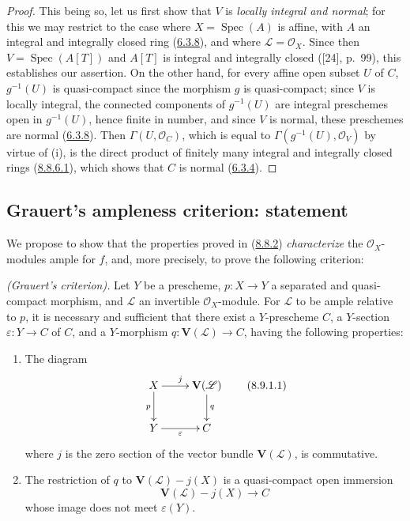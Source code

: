 \begin{proof}
This being so, let us first show that $V$ is \emph{locally integral and
normal}; for this we may restrict to the case where $X=\operatorname{Spec}(A)$
is affine, with $A$ an integral and integrally closed ring
(\hyperref[II.6.3.8]{6.3.8}), and where
$\mathcal{L}=\mathcal{O}_X$. Since then
$V=\operatorname{Spec}(A[T])$ and $A[T]$ is integral and integrally closed
([24], p.~99), this establishes our assertion. On the other hand, for every
affine open subset $U$ of $C$, $g^{-1}(U)$ is quasi-compact since the morphism
$g$ is quasi-compact; since $V$ is locally integral, the connected components
of $g^{-1}(U)$ are integral preschemes open in $g^{-1}(U)$, hence finite in
number, and since $V$ is normal, these preschemes are normal
(\hyperref[II.6.3.8]{6.3.8}). Then $\Gamma(U,\mathcal{O}_C)$, which is equal
to $\Gamma(g^{-1}(U),\mathcal{O}_V)$ by virtue of (i), is the direct product
of finitely many integral and integrally closed rings
(\hyperref[II.8.8.6.1]{8.8.6.1}), which shows that $C$ is normal
(\hyperref[II.6.3.4]{6.3.4}).
\end{proof}

\subsection{Grauert's ampleness criterion: statement}
\label{subsection:II.8.9}

We propose to show that the properties proved in
(\hyperref[II.8.8.2]{8.8.2}) \emph{characterize} the
$\mathcal{O}_X$-modules ample for $f$, and, more precisely, to prove the
following criterion:

\begin{theorem}[8.9.1]
\label{II.8.9.1}
\emph{(Grauert's criterion).} Let $Y$ be a prescheme,
$p:X\to Y$ a separated and quasi-compact morphism, and $\mathcal{L}$ an
invertible $\mathcal{O}_X$-module. For $\mathcal{L}$ to be ample
relative to $p$, it is necessary and sufficient that there exist a
$Y$-prescheme $C$, a $Y$-section $\varepsilon:Y\to C$ of $C$, and a
$Y$-morphism $q:\mathbf{V}(\mathcal{L})\to C$, having the following
properties:
\begin{enumerate}
  \item[\rm{(i)}] The diagram
  \begin{equation}
  \label{II.8.9.1.1}
    \xymatrix{
      X\ar[r]^{j}\ar[d]_{p} & \mathbf{V}(\mathcal{L})\ar[d]^{q}\\
      Y\ar[r]_{\varepsilon} & C
    }
  \tag{8.9.1.1}
  \end{equation}
  where $j$ is the zero section of the vector bundle $\mathbf{V}(\mathcal{L})$,
  is commutative.
  \item[\rm{(ii)}] The restriction of $q$ to
  $\mathbf{V}(\mathcal{L})-j(X)$ is a quasi-compact open immersion
  \[
    \mathbf{V}(\mathcal{L})-j(X)\longrightarrow C
  \]
  whose image does not meet $\varepsilon(Y)$.
\end{enumerate}
\end{theorem}

